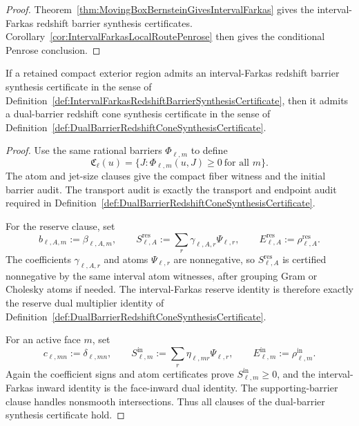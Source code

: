 \begin{proof}
Theorem~\ref{thm:MovingBoxBernsteinGivesIntervalFarkas} gives the
interval-Farkas redshift barrier synthesis certificates.  Corollary~\ref{cor:IntervalFarkasLocalRoutePenrose}
then gives the conditional Penrose conclusion.
\end{proof}

\begin{theorem}\label{thm:IntervalFarkasGivesDualBarrierSynthesis}
If a retained compact exterior region admits an interval-Farkas redshift
barrier synthesis certificate in the sense of
Definition~\ref{def:IntervalFarkasRedshiftBarrierSynthesisCertificate}, then it
admits a dual-barrier redshift cone synthesis certificate in the sense of
Definition~\ref{def:DualBarrierRedshiftConeSynthesisCertificate}.
\end{theorem}

\begin{proof}
Use the same rational barriers $\Phi_{\ell,m}$ to define
\[
    \mathfrak C_\ell(u)=\{J:\Phi_{\ell,m}(u,J)\ge0\ \text{for all }m\}.
\]
The atom and jet-size clauses give the compact fiber witness and the initial
barrier audit.  The transport audit is exactly the transport and endpoint audit
required in Definition~\ref{def:DualBarrierRedshiftConeSynthesisCertificate}.

For the reserve clause, set
\[
    b_{\ell,A,m}:=\beta_{\ell,A,m},
    \qquad
    S_{\ell,A}^{\mathrm{res}}
    :=
    \sum_r\gamma_{\ell,A,r}\Psi_{\ell,r},
    \qquad
    E_{\ell,A}^{\mathrm{res}}
    :=
    \rho_{\ell,A}^{\mathrm{res}} .
\]
The coefficients $\gamma_{\ell,A,r}$ and atoms $\Psi_{\ell,r}$ are
nonnegative, so $S_{\ell,A}^{\mathrm{res}}$ is certified nonnegative by the
same interval atom witnesses, after grouping Gram or Cholesky atoms if needed.
The interval-Farkas reserve identity is therefore exactly the reserve dual
multiplier identity of
Definition~\ref{def:DualBarrierRedshiftConeSynthesisCertificate}.

For an active face $m$, set
\[
    c_{\ell,mn}:=\delta_{\ell,mn},
    \qquad
    S_{\ell,m}^{\mathrm{in}}
    :=
    \sum_r\eta_{\ell,mr}\Psi_{\ell,r},
    \qquad
    E_{\ell,m}^{\mathrm{in}}
    :=
    \rho_{\ell,m}^{\mathrm{in}} .
\]
Again the coefficient signs and atom certificates prove
$S_{\ell,m}^{\mathrm{in}}\ge0$, and the interval-Farkas inward identity is the
face-inward dual identity.  The supporting-barrier clause handles nonsmooth
intersections.  Thus all clauses of the dual-barrier synthesis certificate
hold.
\end{proof}

